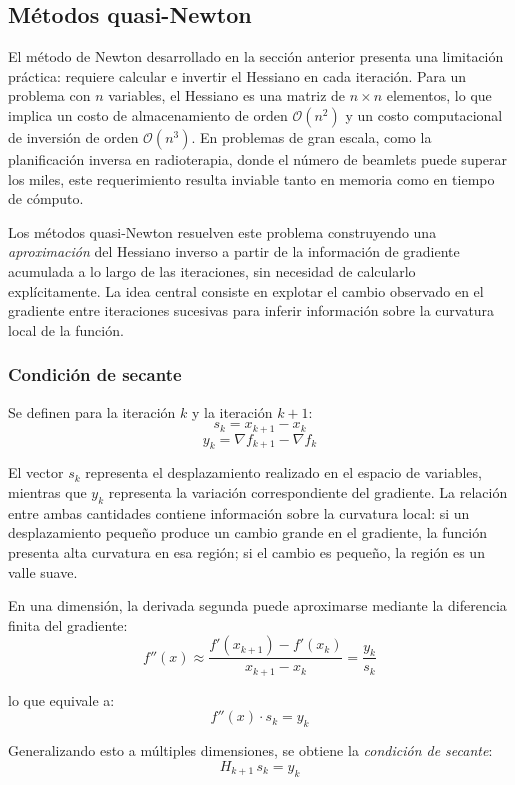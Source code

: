 \subsection{Métodos quasi-Newton}

El método de Newton desarrollado en la sección anterior presenta una limitación práctica: requiere calcular e invertir el Hessiano en cada iteración. Para un problema con \(n\) variables, el Hessiano es una matriz de \(n \times n\) elementos, lo que implica un costo de almacenamiento de orden \(\mathcal{O}(n^2)\) y un costo computacional de inversión de orden \(\mathcal{O}(n^3)\). En problemas de gran escala, como la planificación inversa en radioterapia, donde el número de beamlets puede superar los miles, este requerimiento resulta inviable tanto en memoria como en tiempo de cómputo.

Los métodos quasi-Newton resuelven este problema construyendo una \textit{aproximación} del Hessiano inverso a partir de la información de gradiente acumulada a lo largo de las iteraciones, sin necesidad de calcularlo explícitamente. La idea central consiste en explotar el cambio observado en el gradiente entre iteraciones sucesivas para inferir información sobre la curvatura local de la función.

\subsubsection*{Condición de secante}

Se definen para la iteración \(k\) y la iteración \(k+1\):
\[
s_k = x_{k+1} - x_k
\]
\[
y_k = \nabla f_{k+1} - \nabla f_k
\]

El vector \(s_k\) representa el desplazamiento realizado en el espacio de variables, mientras que \(y_k\) representa la variación correspondiente del gradiente. La relación entre ambas cantidades contiene información sobre la curvatura local: si un desplazamiento pequeño produce un cambio grande en el gradiente, la función presenta alta curvatura en esa región; si el cambio es pequeño, la región es un valle suave.

En una dimensión, la derivada segunda puede aproximarse mediante la diferencia finita del gradiente:
\[
f''(x) \approx \frac{f'(x_{k+1}) - f'(x_k)}{x_{k+1} - x_k} = \frac{y_k}{s_k}
\]

lo que equivale a:
\[
f''(x) \cdot s_k = y_k
\]

Generalizando esto a múltiples dimensiones, se obtiene la \textit{condición de secante}:
\[
H_{k+1}\, s_k = y_k
\]

